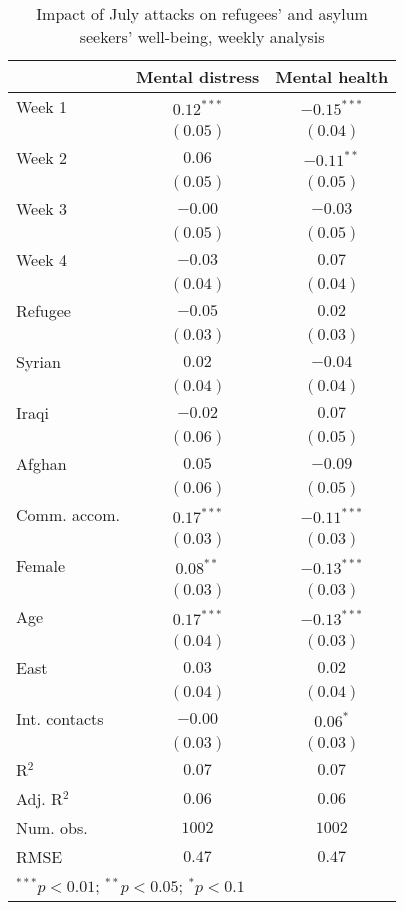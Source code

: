 
\begin{table}
\caption{Impact of July attacks on refugees' and asylum seekers' well-being, weekly analysis}
\begin{center}
\begin{tabular}{l c c}
\toprule
 & Mental distress & Mental health \\
\midrule
Week 1        & $0.12^{***}$ & $-0.15^{***}$ \\
              & $(0.05)$     & $(0.04)$      \\
Week 2        & $0.06$       & $-0.11^{**}$  \\
              & $(0.05)$     & $(0.05)$      \\
Week 3        & $-0.00$      & $-0.03$       \\
              & $(0.05)$     & $(0.05)$      \\
Week 4        & $-0.03$      & $0.07$        \\
              & $(0.04)$     & $(0.04)$      \\
Refugee       & $-0.05$      & $0.02$        \\
              & $(0.03)$     & $(0.03)$      \\
Syrian        & $0.02$       & $-0.04$       \\
              & $(0.04)$     & $(0.04)$      \\
Iraqi         & $-0.02$      & $0.07$        \\
              & $(0.06)$     & $(0.05)$      \\
Afghan        & $0.05$       & $-0.09$       \\
              & $(0.06)$     & $(0.05)$      \\
Comm. accom.  & $0.17^{***}$ & $-0.11^{***}$ \\
              & $(0.03)$     & $(0.03)$      \\
Female        & $0.08^{**}$  & $-0.13^{***}$ \\
              & $(0.03)$     & $(0.03)$      \\
Age           & $0.17^{***}$ & $-0.13^{***}$ \\
              & $(0.04)$     & $(0.03)$      \\
East          & $0.03$       & $0.02$        \\
              & $(0.04)$     & $(0.04)$      \\
Int. contacts & $-0.00$      & $0.06^{*}$    \\
              & $(0.03)$     & $(0.03)$      \\
\midrule
R$^2$         & $0.07$       & $0.07$        \\
Adj. R$^2$    & $0.06$       & $0.06$        \\
Num. obs.     & $1002$       & $1002$        \\
RMSE          & $0.47$       & $0.47$        \\
\bottomrule
\multicolumn{3}{l}{\scriptsize{$^{***}p<0.01$; $^{**}p<0.05$; $^{*}p<0.1$}}
\end{tabular}
\label{tab_mhealth_week}
\end{center}
\end{table}
